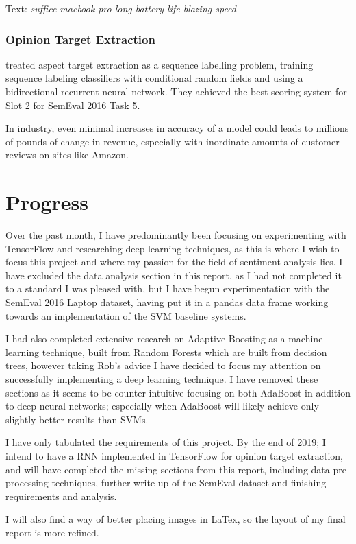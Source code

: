 \begin{center}
    Text: \textit{suffice macbook pro long battery life blazing speed}
\end{center}




\subsubsection{Opinion Target Extraction}
\textcolor{cite}{\citet{tohsu}} treated aspect target extraction as a sequence labelling problem, training sequence labeling classifiers with conditional random fields and using a bidirectional recurrent neural network. They achieved the best scoring system for Slot 2 for SemEval 2016 Task 5.  


In industry, even minimal increases in accuracy of a model could leads to millions of pounds of change in revenue, especially with inordinate amounts of customer reviews on sites like Amazon. 




\section{Progress}

Over the past month, I have predominantly been focusing on experimenting with TensorFlow and researching deep learning techniques, as this is where I wish to focus this project and where my passion for the field of sentiment analysis lies. 
I have excluded the data analysis section in this report, as I had not completed it to a standard I was pleased with, but I have begun experimentation with the SemEval 2016 Laptop dataset, having put it in a pandas data frame working towards an implementation of the SVM baseline systems. 

I had also completed extensive research on Adaptive Boosting as a machine learning technique, built from Random Forests which are built from decision trees, however taking Rob's advice I have decided to focus my attention on successfully implementing a deep learning technique. I have removed these sections as it seems to be counter-intuitive focusing on both AdaBoost in addition to deep neural networks; especially when AdaBoost will likely achieve only slightly better results than SVMs.

I have only tabulated the requirements of this project.
By the end of 2019; I intend to have a RNN implemented in TensorFlow for opinion target extraction, and will have completed the missing sections from this report, including data pre-processing techniques, further write-up of the SemEval dataset and finishing requirements and analysis.   

I will also find a way of better placing images in LaTex, so the layout of my final report is more refined. 
\newpage

